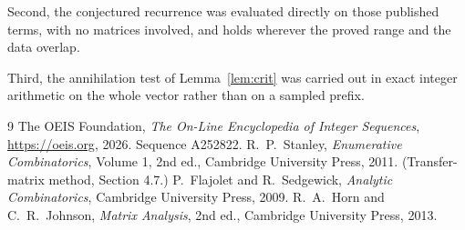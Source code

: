 \documentclass[11pt,a4paper]{article}
\theoremstyle{plain}
\theoremstyle{definition}
\begin{document}
Second, the conjectured recurrence was evaluated directly on those published terms, with no
matrices involved, and holds wherever the proved range and the data overlap.

Third, the annihilation test of Lemma~\ref{lem:crit} was carried out in exact integer
arithmetic on the whole vector rather than on a sampled prefix.

\begin{thebibliography}{9}
 The OEIS Foundation, \emph{The On-Line Encyclopedia of Integer
Sequences}, \url{https://oeis.org}, 2026. Sequence A252822.
 R.~P.~Stanley, \emph{Enumerative Combinatorics}, Volume 1, 2nd ed.,
Cambridge University Press, 2011. (Transfer-matrix method, Section 4.7.)
 P.~Flajolet and R.~Sedgewick, \emph{Analytic Combinatorics}, Cambridge
University Press, 2009.
 R.~A.~Horn and C.~R.~Johnson, \emph{Matrix Analysis}, 2nd ed., Cambridge
University Press, 2013.
\end{thebibliography}
\end{document}
